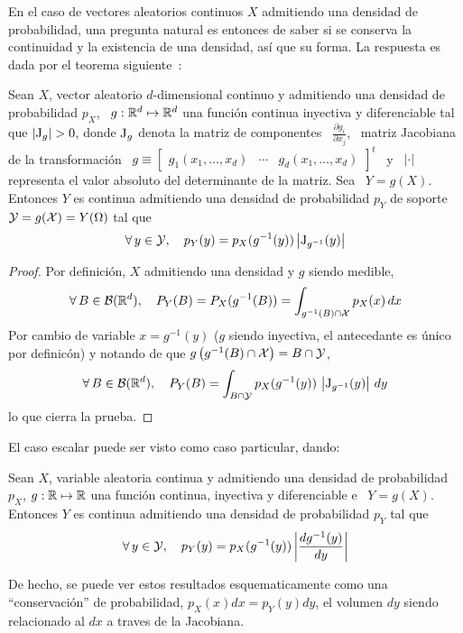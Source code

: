 En  el caso  de vectores  aleatorios continuos  $X$ admitiendo  una  densidad de
probabilidad,  una pregunta  natural  es entonces  de  saber si  se conserva  la
continuidad y la existencia de una densidad, as\'i que su forma. La respuesta es
dada por el teorema siguiente~\cite{Bre88, JacPro03, AthLah06, Coh13, HogMck13}:
%
\begin{teorema}
  Sean $X$, vector aleatorio  $d$-dimensional continuo y admitiendo una densidad
  de probabilidad  $p_X$, \ $g:\mathbb{R}^d  \mapsto \mathbb{R}^d$ una  funci\'on continua
  inyectiva y diferenciable tal que
 $\left| \operatorname{J}_g \right| > 0$,
 donde $\operatorname{J}_g$ denota la  matriz de componentes \ $\frac{\partial g_i}{\partial
   x_j}$, \ matriz Jacobiana de  la transformaci\'on \ $g \equiv \begin{bmatrix}
   g_1(x_1 , \ldots , x_d) & \cdots & g_d(x_1 , \ldots , x_d) \end{bmatrix}^t$ \
 y \ $|\cdot|$ representa el valor absoluto del determinante de la matriz. Sea \
 $Y = g(X)$.   Entonces $Y$ es continua admitiendo  una densidad de probabilidad
 $p_Y$ de soporte $\mathcal{Y} = g(\mathcal{X}) = Y(\Omega)$ tal que
  \[
  \forall \,  y \in  \mathcal{Y}, \quad p_Y(y)  = p_X(g^{-1}(y))  \left| \operatorname{J}_{g^{-1}}(y)
  \right|
  \]
\end{teorema}
%
\begin{proof}
Por definici\'on, $X$ admitiendo una densidad y $g$ siendo medible,
%
\[
\forall \, B  \in \mathcal{B}(\mathbb{R}^d), \quad P_Y(B) =  P_X(g^{-1}(B)) = \int_{g^{-1}(B) \cap \mathcal{X}}
p_X(x) \, dx
\]
%
Por cambio de variable $x =  g^{-1}(y)$ ($g$ siendo inyectiva, el antecedante es
\'unico por definic\'on) y notando de que $g\left( g^{-1}(B) \cap \mathcal{X} \right) = B
\cap \mathcal{Y}$,
%
\[
\forall \, B \in \mathcal{B}(\mathbb{R}^d), \quad  P_Y(B) = \int_{B \cap \mathcal{Y}} p_X(g^{-1}(y)) \,
\left| \operatorname{J}_{g^{-1}}(y) \right| \, dy
\]
%
lo que cierra la prueba.
\end{proof}

El caso escalar puede ser visto como caso particular, dando:
%
\begin{corolario}
  Sean  $X$,   variable  aleatoria  continua   y  admitiendo  una   densidad  de
  probabilidad $p_X$, $g:\mathbb{R} \mapsto  \mathbb{R}$ una funci\'on continua, inyectiva
  y  diferenciable e  \ $Y  = g(X)$.   Entonces $Y$  es continua  admitiendo una
  densidad de probabilidad $p_Y$ tal que
  \[
  \forall  \,   y  \in  \mathcal{Y},   \quad  p_Y(y)  =  p_X(g^{-1}(y))   \left|  \frac{d
      g^{-1}(y)}{dy} \right|
  \]
\end{corolario}
%
\noindent  De hecho,  se puede  ver estos  resultados esquematicamente  como una
``conservaci\'on'' de  probabilidad, $p_X(x)  dx = p_Y(y)  dy$, el  volumen $dy$
siendo relacionado al $dx$ a traves de la Jacobiana.

